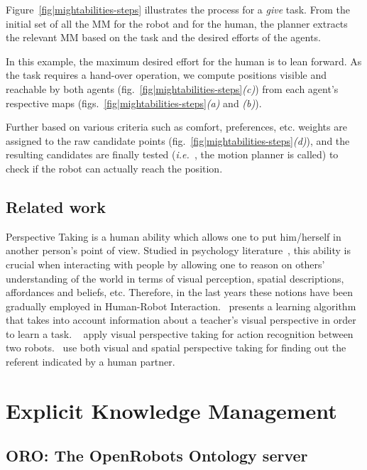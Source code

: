 \documentclass{svmult}
\newcommand{\ie}{{\textit{i.e.~}}}
\begin{document}
Figure~\ref{fig|mightabilities-steps} illustrates the process for a \emph{give}
task. From the initial set of all the MM for the robot and for the human, the
planner extracts the relevant MM based on the task and the desired efforts of
the agents.

In this example, the maximum desired effort for the human is to lean forward.
As the task requires a hand-over operation, we compute positions visible and
reachable by both agents (fig.~\ref{fig|mightabilities-steps}{\it(c)}) from
each agent's respective maps (figs.~\ref{fig|mightabilities-steps}{\it(a)} and
{\it(b)}).

Further based on various criteria such as comfort, preferences, etc. weights
are assigned to the raw candidate points
(fig.~\ref{fig|mightabilities-steps}{\it(d)}), and the resulting candidates are
finally tested (\ie, the motion planner is called) to check if the robot can
actually reach the position.

\subsection{Related work}

Perspective Taking is a human ability which allows one to put
him/herself in another person's point of view. Studied in
psychology literature~\cite{Flavell1992,Tversky1999}, this ability is
crucial when interacting with people by allowing one to reason on
others' understanding of the world in terms of visual perception, spatial
descriptions, affordances and beliefs, etc.
Therefore, in the last years these notions have been gradually
employed in Human-Robot Interaction.~\cite{breazeal2006} presents a
learning algorithm that takes into account information about a
teacher's visual perspective in order to learn a
task. ~\cite{Johnson2005} apply visual perspective taking for action
recognition between two robots.~\cite{Trafton2005} use both visual and
spatial perspective taking for finding out the referent indicated by a
human partner.


\section{Explicit Knowledge Management}
\label{cognitivekernel}

\subsection{ORO: The OpenRobots Ontology server}
\end{document}
